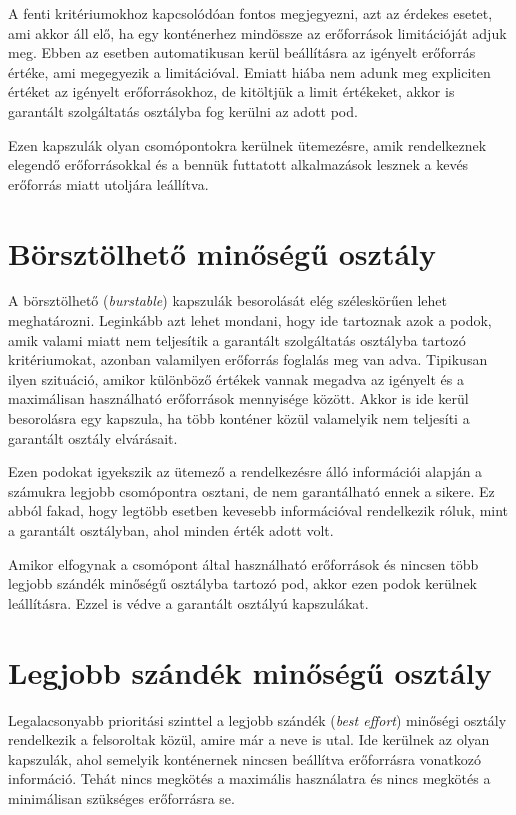 A fenti kritériumokhoz kapcsolódóan fontos megjegyezni, azt az érdekes esetet, ami akkor áll elő, ha egy konténerhez mindössze az erőforrások limitációját adjuk meg.
Ebben az esetben automatikusan kerül beállításra az igényelt erőforrás értéke, ami megegyezik a limitációval.
Emiatt hiába nem adunk meg expliciten értéket az igényelt erőforrásokhoz, de kitöltjük a limit értékeket, akkor is garantált szolgáltatás osztályba fog kerülni az adott pod.

Ezen kapszulák olyan csomópontokra kerülnek ütemezésre, amik rendelkeznek elegendő erőforrásokkal és a bennük futtatott alkalmazások lesznek a kevés erőforrás miatt utoljára leállítva.

\section{Börsztölhető minőségű osztály}
A börsztölhető (\textit{burstable}) kapszulák besorolását elég széleskörűen lehet meghatározni.
Leginkább azt lehet mondani, hogy ide tartoznak azok a podok, amik valami miatt nem teljesítik a garantált szolgáltatás osztályba tartozó kritériumokat, azonban valamilyen erőforrás foglalás meg van adva.
Tipikusan ilyen szituáció, amikor különböző értékek vannak megadva az igényelt és a maximálisan használható erőforrások mennyisége között.
Akkor is ide kerül besorolásra egy kapszula, ha több konténer közül valamelyik nem teljesíti a garantált osztály elvárásait.

Ezen podokat igyekszik az ütemező a rendelkezésre álló információi alapján a számukra legjobb csomópontra osztani, de nem garantálható ennek a sikere.
Ez abból fakad, hogy legtöbb esetben kevesebb információval rendelkezik róluk, mint a garantált osztályban, ahol minden érték adott volt.

Amikor elfogynak a csomópont által használható erőforrások és nincsen több legjobb szándék minőségű osztályba tartozó pod, akkor ezen podok kerülnek leállításra. 
Ezzel is védve a garantált osztályú kapszulákat.

\section{Legjobb szándék minőségű osztály}
Legalacsonyabb prioritási szinttel a legjobb szándék (\textit{best effort}) minőségi osztály rendelkezik a felsoroltak közül, amire már a neve is utal.
Ide kerülnek az olyan kapszulák, ahol semelyik konténernek nincsen beállítva erőforrásra vonatkozó információ.
Tehát nincs megkötés a maximális használatra és nincs megkötés a minimálisan szükséges erőforrásra se.

